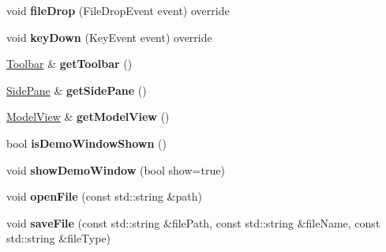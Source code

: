 \begin{DoxyCompactItemize}
\mbox{\label{classpepr3d_1_1_main_application_a5328b13b9f1d06c7897f503e32ddfcc7}} 
void {\bfseries file\+Drop} (File\+Drop\+Event event) override
\item 
\mbox{\label{classpepr3d_1_1_main_application_aba1caad067c409097504d7a4d2ce52ee}} 
void {\bfseries key\+Down} (Key\+Event event) override
\item 
\mbox{\label{classpepr3d_1_1_main_application_a729e5a9d504e19d4d9ded03b36389e72}} 
\mbox{\hyperlink{classpepr3d_1_1_toolbar}{Toolbar}} \& {\bfseries get\+Toolbar} ()
\item 
\mbox{\label{classpepr3d_1_1_main_application_a0cdfc3de57eb4d504a1c03ddd6089670}} 
\mbox{\hyperlink{classpepr3d_1_1_side_pane}{Side\+Pane}} \& {\bfseries get\+Side\+Pane} ()
\item 
\mbox{\label{classpepr3d_1_1_main_application_ab1e84ebe5d446b18eb977b325a8b9afc}} 
\mbox{\hyperlink{classpepr3d_1_1_model_view}{Model\+View}} \& {\bfseries get\+Model\+View} ()
\item 
\mbox{\label{classpepr3d_1_1_main_application_abaccd25f162b70a1d56eef7dfa5f6d35}} 
bool {\bfseries is\+Demo\+Window\+Shown} ()
\item 
\mbox{\label{classpepr3d_1_1_main_application_ac5472dc8c46954026bd65c72ef3de3e9}} 
void {\bfseries show\+Demo\+Window} (bool show=true)
\item 
\mbox{\label{classpepr3d_1_1_main_application_a91ce9fd9f93a11384734e98e72173609}} 
void {\bfseries open\+File} (const std\+::string \&path)
\item 
\mbox{\label{classpepr3d_1_1_main_application_a933ddc19590cae5528ccd93536b4b921}} 
void {\bfseries save\+File} (const std\+::string \&file\+Path, const std\+::string \&file\+Name, const std\+::string \&file\+Type)
\item 
\mbox{\label{classpepr3d_1_1_main_application_a0e7e06ee55cd65c2bdc30ec2742f50ab}} 

\end{DoxyCompactItemize}
